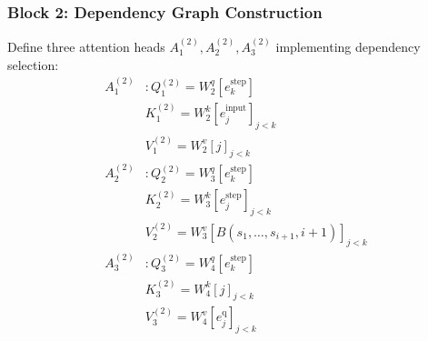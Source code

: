 \subsubsection{Block 2: Dependency Graph Construction} 
Define three attention heads $A^{(2)}_1, A^{(2)}_2, A^{(2)}_3$ implementing dependency selection:
\begin{align*}
    A^{(2)}_1&: Q^{(2)}_1 = W^q_2[e^{\text{step}}_k] \\
    &K^{(2)}_1 = W^k_2[e^{\text{input}}_j]_{j<k} \\
    &V^{(2)}_1 = W^v_2[j]_{j<k} \\
    A^{(2)}_2&: Q^{(2)}_2 = W^q_3[e^{\text{step}}_k] \\
    &K^{(2)}_2 = W^k_3[e^{\text{step}}_j]_{j<k} \\
    &V^{(2)}_2 = W^v_3[B(s_1,\ldots,s_{i+1}, i+1)]_{j<k} \\
    A^{(2)}_3&: Q^{(2)}_3 = W^q_4[e^{\text{step}}_k] \\
    &K^{(2)}_3 = W^k_4[j]_{j<k} \\
    &V^{(2)}_3 = W^v_4[e^{\text{q}}_j]_{j<k}
\end{align*}

